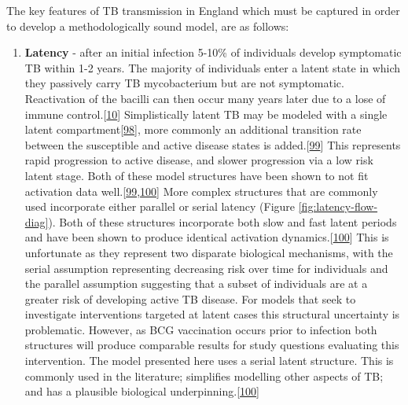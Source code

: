 \documentclass[11pt,twoside]{bristolthesis}
\providecommand{\tightlist}{%
  \setlength{\itemsep}{0pt}\setlength{\parskip}{0pt}}
\begin{document}
  The key features of TB transmission in England which must be captured in order to develop a methodologically sound model, are as follows:
  \begin{enumerate}
  \def\labelenumi{\arabic{enumi}.}
  \tightlist
  \item
    \textbf{Latency} - after an initial infection 5-10\% of individuals develop symptomatic TB within 1-2 years. The majority of individuals enter a latent state in which they passively carry TB mycobacterium but are not symptomatic. Reactivation of the bacilli can then occur many years later due to a lose of immune control.{[}\protect\hyperlink{ref-Gideon2011a}{10}{]} Simplistically latent TB may be modeled with a single latent compartment{[}\protect\hyperlink{ref-Brooks-Pollock2010a}{98}{]}, more commonly an additional transition rate between the susceptible and active disease states is added.{[}\protect\hyperlink{ref-Menzies2018}{99}{]} This represents rapid progression to active disease, and slower progression via a low risk latent stage. Both of these model structures have been shown to not fit activation data well.{[}\protect\hyperlink{ref-Menzies2018}{99},\protect\hyperlink{ref-Ragonnet2017}{100}{]} More complex structures that are commonly used incorporate either parallel or serial latency (Figure \ref{fig:latency-flow-diag}). Both of these structures incorporate both slow and fast latent periods and have been shown to produce identical activation dynamics.{[}\protect\hyperlink{ref-Ragonnet2017}{100}{]} This is unfortunate as they represent two disparate biological mechanisms, with the serial assumption representing decreasing risk over time for individuals and the parallel assumption suggesting that a subset of individuals are at a greater risk of developing active TB disease. For models that seek to investigate interventions targeted at latent cases this structural uncertainty is problematic. However, as BCG vaccination occurs prior to infection both structures will produce comparable results for study questions evaluating this intervention. The model presented here uses a serial latent structure. This is commonly used in the literature; simplifies modelling other aspects of TB; and has a plausible biological underpinning.{[}\protect\hyperlink{ref-Ragonnet2017}{100}{]}
  \end{enumerate}
\end{document}
